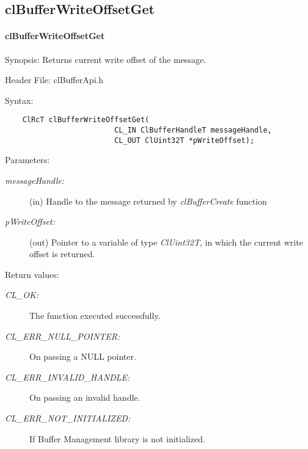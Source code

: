 \subsection{clBufferWriteOffsetGet}
\hypertarget{pagebuf118}{}\paragraph{cl\-Buffer\-Write\-Offset\-Get}\label{pagebuf118}
\begin{Desc}
\item[Synopsis:]Returns current write offset of the message.\end{Desc}
\begin{Desc}
\item[Header File:]clBufferApi.h\end{Desc}
\begin{Desc}
\item[Syntax:]

\footnotesize\begin{verbatim}    ClRcT clBufferWriteOffsetGet(
                         CL_IN ClBufferHandleT messageHandle,
                         CL_OUT ClUint32T *pWriteOffset);
\end{verbatim}
\normalsize
\end{Desc}
\begin{Desc}
\item[Parameters:]
\begin{description}
\item[{\em message\-Handle:}](in) Handle to the message returned by {\em cl\-Buffer\-Create\/} function \item[{\em p\-Write\-Offset:}](out) Pointer to a variable of type {\em Cl\-Uint32T\/}, in which the current write offset is returned.\end{description}
\end{Desc}
\begin{Desc}
\item[Return values:]
\begin{description}
\item[{\em CL\_\-OK:}]The function executed successfully. \item[{\em CL\_\-ERR\_\-NULL\_\-POINTER:}]On passing a NULL pointer. \item[{\em CL\_\-ERR\_\-INVALID\_\-HANDLE:}]On passing an invalid handle. \item[{\em CL\_\-ERR\_\-NOT\_\-INITIALIZED:}]If Buffer Management library is not initialized.\end{description}
\end{Desc}

